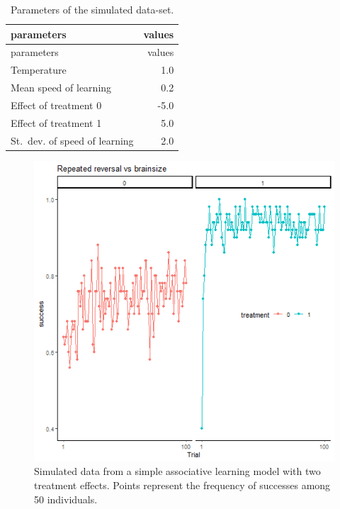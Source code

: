 \documentclass[
]{article}
\begin{document}
\begin{longtable}[]{@{}lr@{}}
\caption{\label{tab:param_simple} Parameters of the simulated
data-set.}\tabularnewline
\toprule\noalign{}
parameters & values \\
\midrule\noalign{}
\endfirsthead
\toprule\noalign{}
parameters & values \\
\midrule\noalign{}
\endhead
\bottomrule\noalign{}
\endlastfoot
Temperature & 1.0 \\
Mean speed of learning & 0.2 \\
Effect of treatment 0 & -5.0 \\
Effect of treatment 1 & 5.0 \\
St.~dev. of speed of learning & 2.0 \\
\end{longtable}

\begin{figure}

\includegraphics[width=6.67in,]{images/simple_DS} \hfill{}

\caption{Simulated data from a simple associative learning model with two treatment effects. Points represent the frequency of successes among 50 individuals.}\label{fig:simple_dataset}
\end{figure}
\end{document}
